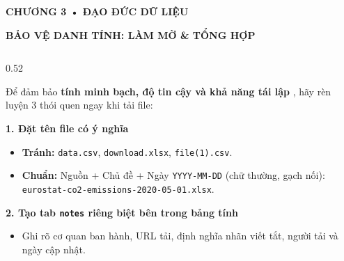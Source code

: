 \documentclass[aspectratio=169, 10pt]{beamer}
\newcommand{\slideheader}[2]{%
    \par\vspace*{-0.15cm}%
    {\fontsize{7.5pt}{9pt}\selectfont \textbf{\color{navyMuted}\MakeUppercase{#1}}}\par\vspace{0.06cm}%
    {\fontsize{13.5pt}{16pt}\selectfont \textbf{\color{navyMain}\MakeUppercase{#2}}}\par\vspace{0.20cm}%
}
\begin{document}
\begin{frame}[plain, t]
\slideheader{Chương 3 • Đạo Đức Dữ Liệu}{Bảo Vệ Danh Tính: Làm Mờ \& Tổng Hợp}
\begin{columns}[T]
\begin{column}{0.52\textwidth}
{\fontsize{8.2pt}{10.5pt}\selectfont
Để đảm bảo \textbf{tính minh bạch, độ tin cậy và khả năng tái lập }, hãy rèn luyện 3 thói quen ngay khi tải file:

\vspace{0.12cm}
\textbf{1. Đặt tên file có ý nghĩa}
\begin{itemize}\setlength{\itemsep}{1.5pt}
    \item \textcolor{accentRed}{\textbf{Tránh:}} \texttt{data.csv}, \texttt{download.xlsx}, \texttt{file(1).csv}.
    \item \textbf{Chuẩn:} Nguồn + Chủ đề + Ngày \texttt{YYYY-MM-DD} (chữ thường, gạch nối):\\ \texttt{eurostat-co2-emissions-2020-05-01.xlsx}.
\end{itemize}

\vspace{0.12cm}
\textbf{2. Tạo tab \texttt{notes} riêng biệt bên trong bảng tính}
\begin{itemize}\setlength{\itemsep}{1.5pt}
    \item Ghi rõ cơ quan ban hành, URL tải, định nghĩa nhãn viết tắt, người tải và ngày cập nhật.
\end{itemize}

}
\end{column}
\end{columns}
\end{frame}
\end{document}
